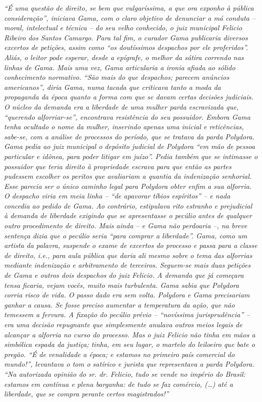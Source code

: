 \begin{didascalia}
\emph{``É uma questão de direito, se bem que vulgaríssima, a que ora
exponho à pública consideração'', iniciava Gama, com o claro objetivo de
denunciar a má conduta -- moral, intelectual e técnica -- do seu velho
conhecido, o juiz municipal Felicio Ribeiro dos Santos Camargo. Para tal
fim, o curador Gama publicaria diversos excertos de petições, assim como
``os doutíssimos despachos por ele proferidos''. Aliás, o leitor pode
esperar, desde a epígrafe, o melhor da sátira correndo nas linhas de
Gama. Mais uma vez, Gama articularia a ironia afiada ao sólido
conhecimento normativo. ``São mais do que despachos; parecem anúncios
americanos'', diria Gama, numa tacada que criticava tanto a moda da
propaganda da época quanto a forma com que se davam certas decisões
judiciais. O núcleo da demanda era a liberdade de uma mulher parda
escravizada que, ``querendo alforriar-se'', encontrava resistência do seu
possuidor. Embora Gama tenha ocultado o nome da mulher, inserindo apenas
uma inicial e reticências, sabe-se, com a análise de processos do
período, que se tratava da parda Polydora. Gama pedia ao juiz municipal
o depósito judicial de Polydora ``em mão de pessoa particular e idônea,
para poder litigar em juízo''. Pedia também que se intimasse o possuidor
que teria direito à propriedade escrava para que então as partes
pudessem escolher os peritos que avaliariam a quantia da indenização
senhorial. Esse parecia ser o único caminho legal para Polydora obter
enfim a sua alforria. O despacho viria em meia linha -- ``de apavorar
tíbios espíritos'' -- e nada concedia ao pedido de Gama. Ao contrário,
estipulava rito estranho e prejudicial à demanda de liberdade exigindo
que se apresentasse o pecúlio antes de qualquer outro procedimento de
direito. Mais ainda -- e Gama não perdoaria --, na breve sentença dizia
que o pecúlio seria ``para comprar a liberdade''. Gama, como um artista da
palavra, suspende o exame de excertos do processo e passa para a classe
de direito, i.e., para aula pública que daria ali mesmo sobre o tema das
alforrias mediante indenização e arbitramento de terceiros. Seguem-se
mais duas petições de Gama e outros dois despachos do juiz Felicio. A
demanda que já começara tensa ficaria, vejam vocês, muito mais
turbulenta. Gama sabia que Polydora corria risco de vida. O passo dado
era sem volta. Polydora e Gama precisariam ganhar a causa. Se fosse
preciso aumentar a temperatura da ação, que não temessem a fervura. A
fixação do pecúlio prévio -- ``novíssima jurisprudência'' -- era uma
decisão repugnante que simplesmente anulava outros meios legais de
alcançar a alforria no curso do processo. Mas o juiz Felicio não tinha
em mãos a simbólica espada da justiça; tinha, em seu lugar, o martelo do
leiloeiro que bate o pregão. ``É de venalidade a época; e estamos no
primeiro país comercial do mundo!'', levantava o tom o satírico e jurista
que representava a parda Polydora. ``Na autorizada opinião do sr. dr.
Felicio, tudo se vende no império do Brasil: estamos em contínua e plena
barganha: de tudo se faz comércio, (\ldots{}) até a liberdade, que se compra
perante certos magistrados!''}
\end{didascalia}

